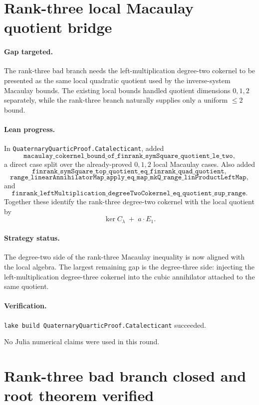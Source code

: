 \documentclass[11pt]{article}
\begin{document}
\section*{Rank-three local Macaulay quotient bridge}

\paragraph{Gap targeted.}
The rank-three bad branch needs the left-multiplication degree-two cokernel to
be presented as the same local quadratic quotient used by the inverse-system
Macaulay bounds.  The existing local bounds handled quotient dimensions
\(0,1,2\) separately, while the rank-three branch naturally supplies only a
uniform \(\leq 2\) bound.

\paragraph{Lean progress.}
In \texttt{QuaternaryQuarticProof.Catalecticant}, added
\[
\texttt{macaulay\_cokernel\_bound\_of\_finrank\_symSquare\_quotient\_le\_two},
\]
a direct case split over the already-proved \(0,1,2\) local Macaulay cases.
Also added
\[
\texttt{finrank\_symSquare\_top\_quotient\_eq\_finrank\_quad\_quotient},
\]
\[
\texttt{range\_linearAnnihilatorMap\_apply\_eq\_map\_mkQ\_range\_linProductLeftMap},
\]
and
\[
\texttt{finrank\_leftMultiplication\_degreeTwoCokernel\_eq\_quotient\_sup\_range}.
\]
Together these identify the rank-three degree-two cokernel with the local
quotient by
\[
\ker C_\lambda \;+\; a\cdot E_1.
\]

\paragraph{Strategy status.}
The degree-two side of the rank-three Macaulay inequality is now aligned with
the local algebra.  The largest remaining gap is the degree-three side:
injecting the left-multiplication degree-three cokernel into the cubic
annihilator attached to the same quotient.

\paragraph{Verification.}
\texttt{lake build QuaternaryQuarticProof.Catalecticant} succeeded.

No Julia numerical claims were used in this round.

\section*{Rank-three bad branch closed and root theorem verified}
\end{document}
